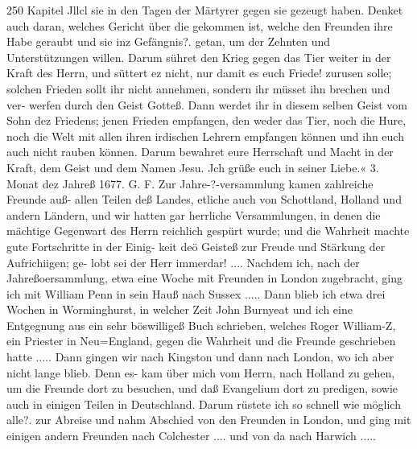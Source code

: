 250 Kapitel Jllcl
sie in den Tagen der Märtyrer gegen sie gezeugt haben. Denket
auch daran, welches Gericht über die gekommen ist, welche den
Freunden ihre Habe geraubt und sie inz Gefängnis?. getan, um
der Zehnten und Unterstützungen willen. Darum sühret den Krieg
gegen das Tier weiter in der Kraft des Herrn, und süttert ez
nicht, nur damit es euch Friede! zurusen solle; solchen Frieden
sollt ihr nicht annehmen, sondern ihr müsset ihn brechen und ver-
werfen durch den Geist Gotteß. Dann werdet ihr in diesem selben
Geist vom Sohn dez Friedens; jenen Frieden empfangen, den
weder das Tier, noch die Hure, noch die Welt mit allen ihren
irdischen Lehrern empfangen können und ihn euch auch nicht
rauben können. Darum bewahret eure Herrschaft und Macht in
der Kraft, dem Geist und dem Namen Jesu. Jch grüße euch in
seiner Liebe.«
3. Monat dez Jahreß 1677. G. F.
Zur Jahre-?-versammlung kamen zahlreiche Freunde auß-
allen Teilen deß Landes, etliche auch von Schottland, Holland
und andern Ländern, und wir hatten gar herrliche Versammlungen,
in denen die mächtige Gegenwart des Herrn reichlich gespürt
wurde; und die Wahrheit machte gute Fortschritte in der Einig-
keit deö Geisteß zur Freude und Stärkung der Aufrichiigen; ge-
lobt sei der Herr immerdar! ....
Nachdem ich, nach der Jahreßoersammlung, etwa eine Woche
mit Freunden in London zugebracht, ging ich mit William Penn
in sein Hauß nach Sussex .....
Dann blieb ich etwa drei Wochen in Worminghurst, in
welcher Zeit John Burnyeat und ich eine Entgegnung aus ein
sehr böswilligeß Buch schrieben, welches Roger William-Z, ein
Priester in Neu=England, gegen die Wahrheit und die Freunde
geschrieben hatte .....
Dann gingen wir nach Kingston und dann nach London, wo
ich aber nicht lange blieb. Denn es- kam über mich vom Herrn,
nach Holland zu gehen, um die Freunde dort zu besuchen, und
daß Evangelium dort zu predigen, sowie auch in einigen Teilen
in Deutschland. Darum rüstete ich so schnell wie möglich alle?.
zur Abreise und nahm Abschied von den Freunden in London,
und ging mit einigen andern Freunden nach Colchester .... und
von da nach Harwich .....


